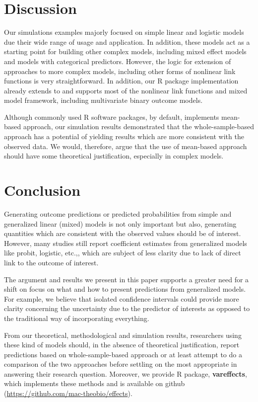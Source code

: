 \documentclass[10pt,letterpaper]{article}
\newcommand{\pkg}[1]{\textbf{#1}}
\let\proglang=\textsf
\begin{document}
\section*{Discussion}

Our simulations examples majorly focused on simple linear and logistic models due their wide range of usage and application. In addition, these models act as a starting point for building other complex models, including mixed effect models and models with categorical predictors. However, the logic for extension of approaches to more complex models, including other forms of nonlinear link functions is very straightforward. In addition, our \proglang{R} package implementation already extends to and supports most of the nonlinear link functions and mixed model framework, including multivariate binary outcome models.

Although commonly used \proglang{R} software packages, by default, implements mean-based approach, our simulation results demonstrated that the whole-sample-based approach has a potential of yielding results which are more consistent with the observed data. We would, therefore, argue that the use of mean-based approach should have some theoretical justification, especially in complex models. 

\section*{Conclusion}

Generating outcome predictions or predicted probabilities from simple and generalized linear (mixed) models is not only important but also, generating quantities which are consistent with the observed values should be of interest. However, many studies still report coefficient estimates from generalized models like probit, logistic, etc.,\cite{hanmer2013behind}, which are subject of less clarity due to lack of direct link to the outcome of interest.

The argument and results we present in this paper supports a greater need for a shift on focus on what and how to present predictions from generalized models. For example, we believe that isolated confidence intervals could provide more clarity concerning the uncertainty due to the predictor of interests as opposed to the traditional way of incorporating everything. 

From our theoretical, methodological and simulation results, researchers using these kind of models should, in the absence of theoretical justification, report predictions based on whole-sample-based approach or at least attempt to do a comparison of the two approaches before settling on the most appropriate in answering their research question. Moreover, we provide \proglang{R} package, \pkg{vareffects}, which implements these methods and is available on github (\href{https://github.com/mac-theobio/effects}{https://github.com/mac-theobio/effects}).
\end{document}
